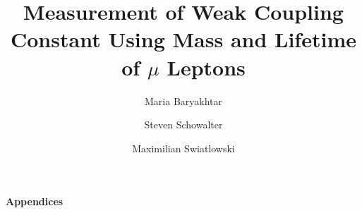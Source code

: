 \documentclass[psfig,12pt,notitlepage]{article}
\begin{document}
\title{Measurement of Weak Coupling Constant Using Mass and Lifetime of $\mu$ Leptons}
\author{Maria Baryakhtar \and Steven Schowalter \and Maximilian Swiatlowski}

\maketitle





\tableofcontents
\setcounter{tocdepth}{2}
\listoffigures


\clearpage












\newpage

\appendix

\begin{center}
\begin{Large}
\bfseries{Appendices}
\end{Large}
\end{center}





\end{document}
